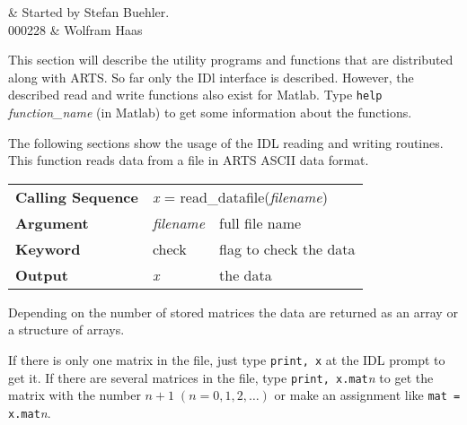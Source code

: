 %
%
 \label{sec:utilities}

%
%
 & Started by Stefan Buehler.\\
  000228 & Wolfram Haas
\stophistory


This section will describe the utility programs and functions that are
distributed along with ARTS. So far only the IDl interface is
described.  However, the described read and write functions also exist
for Matlab.  Type \verb|help| {\it function\_name} (in Matlab) to get
some information about the functions.



\label{sec:utilities:aii}

The following sections show the usage of the IDL reading and writing
routines.
This function reads data from a file in ARTS ASCII data format.
\begin{center}
\begin{tabular}{|l|ll|}
  \hline
  \textbf{Calling Sequence} &
  \multicolumn{2}{l|}{\textit{x} = %
  {\ttfamily read\_datafile(\textnormal{\textit{filename}})}}     \\ 
  \textbf{Argument} & \textit{filename} & full file name          \\
  \textbf{Keyword}  & check             & flag to check the data  \\
  \textbf{Output}   & \textit{x}        & the data                \\
  \hline
\end{tabular}
\end{center}
Depending on the number of stored matrices the data are returned as an
array or a structure of arrays.

If there is only one matrix in the file, just type \hspace{1ex}
\texttt{print, x} \hspace{1ex} at the IDL prompt to get it. If there
are several matrices in the file, type \hspace{1ex} \texttt{print, 
x.mat}\textit{n} \hspace{1ex} to get the matrix with the number $n +
1\;( n = 0, 1, 2, \ldots)$ or make an assignment like \hspace{1ex}
\texttt{mat = x.mat}\textit{n}.

